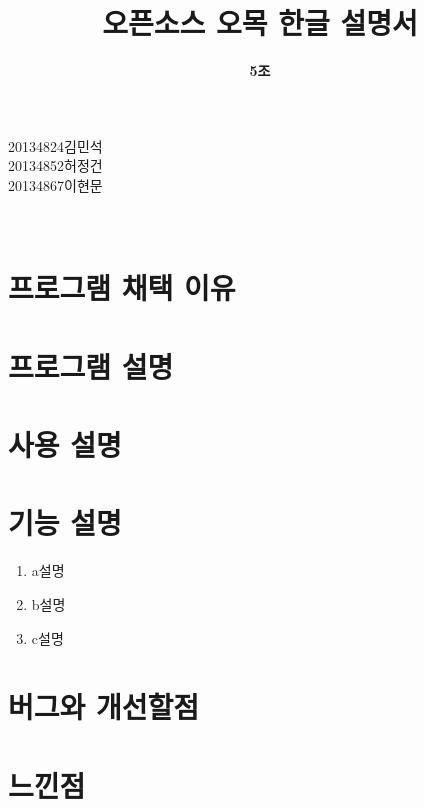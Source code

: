 \documentclass[a4paper, 11pt]{article}
\title{\textbf{오픈소스 오목 한글 설명서}}
\author{\textbf{5조}}
\begin{document}
	
	\maketitle
	
	\vspace{1cm}
\begin{flushright}
	20134824김민석\\
	20134852허정건\\
	20134867이현문\\
\end{flushright}
	
	
	
	
	\maketitle
	\newpage
	\thispagestyle{empty}        
	\mbox{}
	
	\begin{center} 
		\textbf{}\\
	\end{center}
	\vspace{1cm}
	\section{프로그램 채택 이유}
	\vspace{1cm}
	\section{프로그램 설명}
	\vspace{1cm}
	\section{사용 설명}
	\vspace{1cm}
	
	\section{기능 설명}
	\begin{enumerate}
		\item a설명
		\item b설명
		\item c설명
	\end{enumerate}

	

	
	\vspace{1cm}
	\section{버그와 개선할점}
	
	\vspace{1cm}
	\section{느낀점}
	
\end{document}
